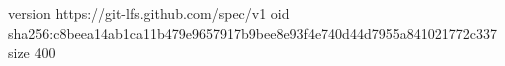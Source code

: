version https://git-lfs.github.com/spec/v1
oid sha256:c8beea14ab1ca11b479e9657917b9bee8e93f4e740d44d7955a841021772c337
size 400

